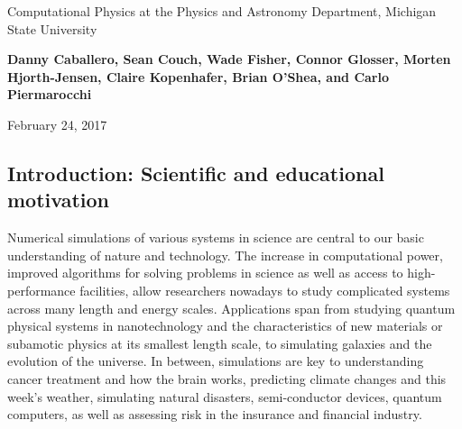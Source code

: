 \documentclass[%
oneside,                 %
final,                   %
10pt]{article}
\begin{document}

\newcommand{\exercisesection}[1]{\subsection*{#1}}






\thispagestyle{empty}

\begin{center}
{\LARGE\bf
\begin{spacing}{1.25}
Computational Physics at the Physics and Astronomy Department, Michigan State University
\end{spacing}
}
\end{center}


\begin{center}
{\bf Danny Caballero, Sean Couch, Wade Fisher, Connor Glosser, Morten Hjorth-Jensen, Claire Kopenhafer, Brian O'Shea, and Carlo Piermarocchi${}^{}$} \\ [0mm]
\end{center}

\begin{center}
\end{center}
    

\begin{center}
February 24, 2017
\end{center}

\vspace{1cm}


\subsection*{Introduction: Scientific and educational motivation}

Numerical simulations of various systems in science are central to our
basic understanding of nature and technology.
The increase in computational power,
improved algorithms for solving problems in science as well as access
to high-performance facilities, allow researchers nowadays to study
complicated systems across many length and energy scales. Applications
span from studying quantum physical systems in nanotechnology and the
characteristics of new materials or subamotic physics at its smallest
length scale, to simulating galaxies and the evolution of the universe.
In between, simulations are key to understanding
cancer treatment and how the brain works,
predicting climate changes and this week's weather,
simulating natural disasters, semi-conductor devices,
quantum computers, as well as assessing risk in the insurance and
financial industry. 
\end{document}
